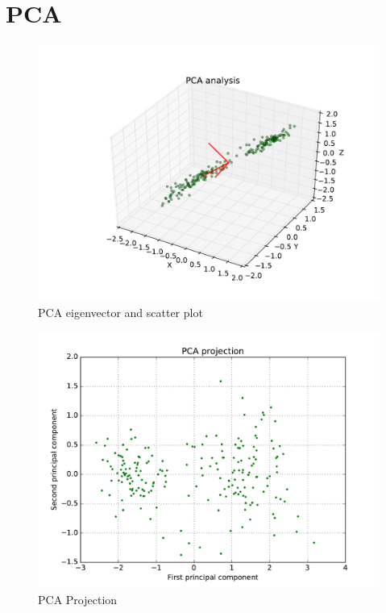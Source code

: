 

\usepackage{graphicx, amssymb, amsmath, listings, float, mathtools}
\usepackage{color, url}
\lstset{language = Python}
\lstset{breaklines}
\lstset{extendedchars=false}

\oddsidemargin 0in
\evensidemargin 0in
\textwidth 6.5in
\topmargin -0.6in
\textheight 9.0in




\section*{\Large PCA}

\begin{figure}[H]
\centering
\includegraphics[width=1.0\textwidth]{./figures/3d.pdf}
\caption{\label{fig:3d} PCA eigenvector and scatter plot}
\end{figure}

\begin{figure}[H]
\centering
\includegraphics[width=1.0\textwidth]{./figures/projection.pdf}
\caption{\label{fig:projection} PCA Projection}
\end{figure}


\clearpage

%
%
%



